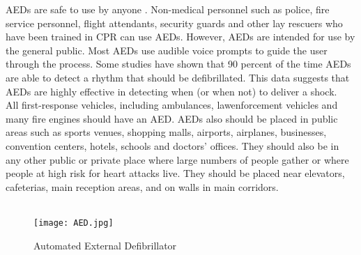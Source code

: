 \documentclass[12pt]{article}
\begin{document}
AEDs are safe to use by anyone . Non-medical personnel such as police, fire service personnel, flight attendants, security guards and other lay rescuers who have been trained in CPR can use AEDs. However, AEDs are intended for use by the general public. Most AEDs use audible voice prompts to guide the user through the process.\newlinw
 Some studies have shown that 90 percent of the time AEDs are able to detect a rhythm that should be defibrillated. This data suggests that AEDs are highly effective in detecting when (or when not) to deliver a shock.\newline \\
 All first-response vehicles, including ambulances, lawenforcement vehicles and many fire engines should have an AED. AEDs also should be placed in public areas such as sports venues, shopping malls, airports, airplanes, businesses, convention centers, hotels, schools and doctors’ offices. They should also be in any other public or private place where large numbers of people gather or where people at high risk for heart attacks live. They should be placed near elevators, cafeterias, main reception areas, and on walls in main corridors.\newline \\\\
 \begin{figure}
     \centering
     \texttt{[image: AED.jpg]}
     \caption{Automated External Defibrillator}
 \end{figure}
 \newpage
\end{document}
